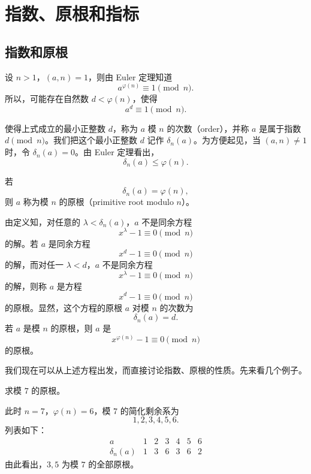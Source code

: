 \chapter{指数、原根和指标}
\label{chap:indices-primitive-roots}


\section{指数和原根}

设 $n>1$，$(a,n)=1$，则由 Euler 定理知道
\[
	a^{\varphi(n)}\equiv 1\pmod n.
\]
所以，可能存在自然数 $d<\varphi(n)$，使得
\[
	a^d\equiv 1\pmod n.
\]

\begin{definition}[原文 定义 1]
	使得上式成立的最小正整数 $d$，称为 $a$ 模 $n$ 的次数（order），并称 $a$ 是属于指数 $d\pmod n$。我们把这个最小正整数 $d$ 记作 $\delta_n(a)$。为方便起见，当 $(a,n)\neq 1$ 时，令 $\delta_n(a)=0$。由 Euler 定理看出，
	\[
		\delta_n(a)\leq \varphi(n).
	\]
\end{definition}

\begin{definition}[原文 定义 2]
	若
	\[
		\delta_n(a)=\varphi(n),
	\]
	则 $a$ 称为模 $n$ 的原根（primitive root modulo $n$）。
\end{definition}

由定义知，对任意的 $\lambda<\delta_n(a)$，$a$ 不是同余方程
\[
	x^\lambda-1\equiv 0\pmod n
\]
的解。若 $a$ 是同余方程
\[
	x^d-1\equiv 0\pmod n
\]
的解，而对任一 $\lambda<d$，$a$ 不是同余方程
\[
	x^\lambda-1\equiv 0\pmod n
\]
的解，则称 $a$ 是方程
\[
	x^d-1\equiv 0\pmod n
\]
的原根。显然，这个方程的原根 $a$ 对模 $n$ 的次数为
\[
	\delta_n(a)=d.
\]
若 $a$ 是模 $n$ 的原根，则 $a$ 是
\[
	x^{\varphi(n)}-1\equiv 0\pmod n
\]
的原根。

我们现在可以从上述方程出发，而直接讨论指数、原根的性质。先来看几个例子。

\begin{example}[原文 例 1]
	求模 $7$ 的原根。

	此时 $n=7$，$\varphi(n)=6$，模 $7$ 的简化剩余系为
	\[
		1,2,3,4,5,6.
	\]
	列表如下：
	\[
	\begin{array}{c|cccccc}
		a & 1 & 2 & 3 & 4 & 5 & 6\\ \hline
		\delta_n(a) & 1 & 3 & 6 & 3 & 6 & 2
	\end{array}
	\]
	由此看出，$3,5$ 为模 $7$ 的全部原根。
\end{example}

